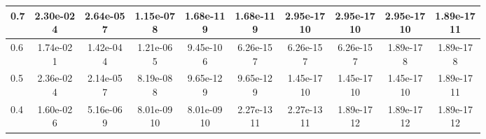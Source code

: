 \begin{table}[H]
\begin{tabular}{|l||c|c|c|c|c|c|c|c|c|}
\hline
 0.7 & \makecell{2.30e-02 \\ 4} & \makecell{2.64e-05 \\ 7} & \makecell{1.15e-07 \\ 8} & \makecell{1.68e-11 \\ 9} & \makecell{1.68e-11 \\ 9} & \makecell{2.95e-17 \\ 10} & \makecell{2.95e-17 \\ 10} & \makecell{2.95e-17 \\ 10} & \makecell{1.89e-17 \\ 11} \\
\hline
 0.6 & \makecell{1.74e-02 \\ 1} & \makecell{1.42e-04 \\ 4} & \makecell{1.21e-06 \\ 5} & \makecell{9.45e-10 \\ 6} & \makecell{6.26e-15 \\ 7} & \makecell{6.26e-15 \\ 7} & \makecell{6.26e-15 \\ 7} & \makecell{1.89e-17 \\ 8} & \makecell{1.89e-17 \\ 8} \\
\hline
 0.5 & \makecell{2.36e-02 \\ 4} & \makecell{2.14e-05 \\ 7} & \makecell{8.19e-08 \\ 8} & \makecell{9.65e-12 \\ 9} & \makecell{9.65e-12 \\ 9} & \makecell{1.45e-17 \\ 10} & \makecell{1.45e-17 \\ 10} & \makecell{1.45e-17 \\ 10} & \makecell{1.89e-17 \\ 11} \\
\hline
 0.4 & \makecell{1.60e-02 \\ 6} & \makecell{5.16e-06 \\ 9} & \makecell{8.01e-09 \\ 10} & \makecell{8.01e-09 \\ 10} & \makecell{2.27e-13 \\ 11} & \makecell{2.27e-13 \\ 11} & \makecell{1.89e-17 \\ 12} & \makecell{1.89e-17 \\ 12} & \makecell{1.89e-17 \\ 12} \\

\end{tabular}
\end{table}
